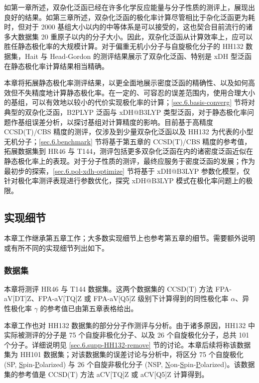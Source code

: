 如第一章所述，双杂化泛函已经在许多化学反应能量与分子性质的测评上，展现出良好的结果。如第三章所述，双杂化泛函的极化率计算尽管相比于杂化泛函更为耗时，但对于 2000 基组大小以内的中等体系是可以接受的，这也契合目前流行的诸多大数据集 20 重原子以内的分子大小\cite{Ruddigkeit-Reymond.JCIM.2012, Ramakrishnan-Lilienfeld.SD.2014, Bowman-Yu.JCP.2022, Zou-Hu.NCS.2023}。因此，双杂化泛函从计算效率上，应可以胜任静态极化率的大规模计算。对于偏重无机小分子与自旋极化分子的 HH132 数据集，Hait 与 Head-Gordon 的测评结果展示了双杂化泛函、特别是 xDH 型泛函在静态极化率计算结果相当精确\cite{Hait-Head-Gordon.PCCP.2018}。

本章将拓展静态极化率测评结果，以更全面地展示密度泛函的精确性、以及如何高效但不失精度地计算静态极化率。在一定的、可容忍的误差范围内，使用合理大小的基组，可以有效地以较小的代价实现极化率的计算；\ref{sec.6.basis-converg} 节将对典型的双杂化泛函，B2PLYP 泛函与 xDH@B3LYP 类型泛函，对于静态极化率问题作基组误差分析，以探讨基组对计算精度的影响。目前基于高精度 CCSD(T)/CBS 精度的测评，仅涉及到少量双杂化泛函以及 HH132\cite{Hait-Head-Gordon.PCCP.2018} 为代表的小型无机分子；\ref{sec.6.benchmark} 节将基于第五章的 CCSD(T)/CBS 精度的参考值，拓展数据集到 HR46\cite{Hickey-Rowley.JPCA.2014} 与 T144\cite{Wu-Thakkar.CPL.2015}，测评包括更多双杂化泛函在内的诸密度泛函近似在静态极化率上的表现。对于分子性质的测评，最终应服务于密度泛函的发展；作为最初步的探索，\ref{sec.6.pol-xdh-optimize} 节将基于 xDH@B3LYP 参数化模型\cite{Zhang-Xu.JPCL.2021}，仅针对极化率测评表现进行参数优化，探究 xDH@B3LYP 模式在极化率问题上的极限。

\subsection{实现细节}

本章工作继承第五章工作；大多数实现细节上也参考\alert{第五章的细节}。需要额外说明或有所不同的实现细节列出如下。

\subsubsection{数据集}

本章将测评 HR46\cite{Hickey-Rowley.JPCA.2014} 与 T144\cite{Wu-Thakkar.CPL.2015} 数据集。这两个数据集的 CCSD(T) 方法 FPA-aV[DT]Z、FPA-aV[TQ]Z 或 FPA-aV[Q5]Z 级别下计算得到的同性极化率 $\alpha$、异性极化率 $\gamma$ 的参考值已由\alert{第五章表格}给出。

本章工作也对 HH132 数据集\cite{Hait-Head-Gordon.PCCP.2018}的部分分子作测评与分析。由于诸多原因，HH132 中实际被测评的分子是 75 个自旋非极化分子、以及 26 个自旋极化分子，总共 101 个分子。详细说明见 \ref{sec.6.supp-HH132-remove} 节的讨论。本章后续将称该数据集为 HH101 数据集；对该数据集的误差讨论与分析中，将区分 75 个自旋极化 (SP, \underline{S}pin-\underline{P}olarized) 与 26 个自旋非极化分子 (NSP, \underline{N}on-\underline{S}pin-\underline{P}olarized)。该数据集的参考值是 CCSD(T) 方法 aCV[TQ]Z 或 aCV[Q5]Z 计算得到。

